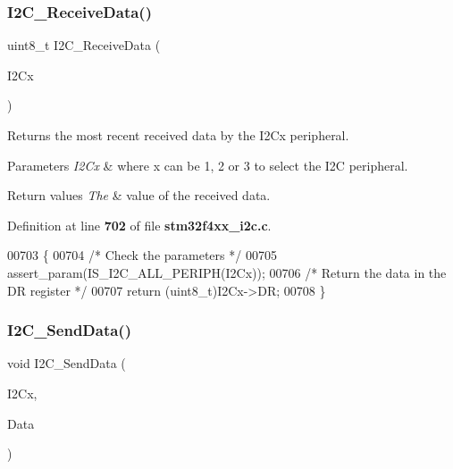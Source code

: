 \subsubsection{I2\+C\+\_\+\+Receive\+Data()}
{\footnotesize\ttfamily uint8\+\_\+t I2\+C\+\_\+\+Receive\+Data (\begin{DoxyParamCaption}\item[{\textbf{ I2\+C\+\_\+\+Type\+Def} $\ast$}]{I2\+Cx }\end{DoxyParamCaption})}



Returns the most recent received data by the I2\+Cx peripheral. 


\begin{DoxyParams}{Parameters}
{\em I2\+Cx} & where x can be 1, 2 or 3 to select the I2C peripheral. \\
\hline
\end{DoxyParams}

\begin{DoxyRetVals}{Return values}
{\em The} & value of the received data. \\
\hline
\end{DoxyRetVals}


Definition at line \textbf{ 702} of file \textbf{ stm32f4xx\+\_\+i2c.\+c}.


\begin{DoxyCode}
00703 \{
00704   \textcolor{comment}{/* Check the parameters */}
00705   assert_param(IS_I2C_ALL_PERIPH(I2Cx));
00706   \textcolor{comment}{/* Return the data in the DR register */}
00707   \textcolor{keywordflow}{return} (uint8\_t)I2Cx->DR;
00708 \}
\end{DoxyCode}
\mbox{\label{group__I2C__Group2_ga7bd9e70b8eafde0dd5eb42b0d95fe1a9}} 
\subsubsection{I2\+C\+\_\+\+Send\+Data()}
{\footnotesize\ttfamily void I2\+C\+\_\+\+Send\+Data (\begin{DoxyParamCaption}\item[{\textbf{ I2\+C\+\_\+\+Type\+Def} $\ast$}]{I2\+Cx,  }\item[{uint8\+\_\+t}]{Data }\end{DoxyParamCaption})}



